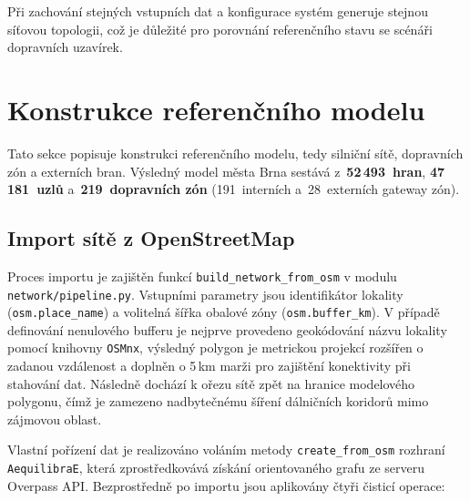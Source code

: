 Při zachování stejných vstupních dat a konfigurace systém generuje stejnou síťovou topologii, což je důležité pro porovnání referenčního stavu se scénáři dopravních uzavírek.


\section{Konstrukce referenčního modelu}
\label{sec:impl-network}

Tato sekce popisuje konstrukci referenčního modelu, tedy silniční sítě, dopravních zón a externích bran. Výsledný model města Brna sestává z~\textbf{52\,493~hran}, \textbf{47\,181~uzlů} a~\textbf{219~dopravních zón} (191~interních a~28~externích gateway zón).

\subsection{Import sítě z OpenStreetMap}
\label{sec:impl-network-osm}

Proces importu je zajištěn funkcí \texttt{build\_network\_from\_osm} v modulu \texttt{network/pipeline.py}. Vstupními parametry jsou identifikátor lokality (\texttt{osm.place\_name}) a volitelná šířka obalové zóny (\texttt{osm.buffer\_km}). V případě definování nenulového bufferu je nejprve provedeno geokódování názvu lokality pomocí knihovny \texttt{OSMnx}, výsledný polygon je metrickou projekcí rozšířen o zadanou vzdálenost a doplněn o 5\,km marži pro zajištění konektivity při stahování dat. Následně dochází k ořezu sítě zpět na hranice modelového polygonu, čímž je zamezeno nadbytečnému šíření dálničních koridorů mimo zájmovou oblast.

Vlastní pořízení dat je realizováno voláním metody \texttt{create\_from\_osm} rozhraní \texttt{AequilibraE}, která zprostředkovává získání orientovaného grafu ze serveru Overpass API. Bezprostředně po importu jsou aplikovány čtyři čisticí operace:

